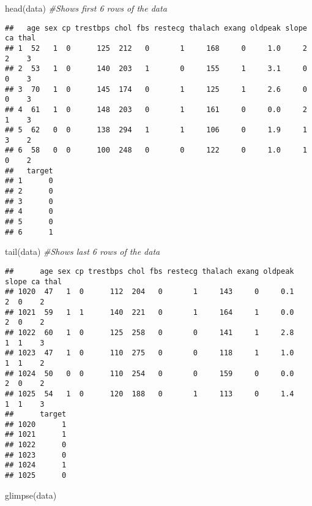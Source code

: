 \documentclass[
]{article}
\newenvironment{Shaded}{\begin{snugshade}}{\end{snugshade}}
\newcommand{\CommentTok}[1]{\textcolor[rgb]{0.56,0.35,0.01}{\textit{#1}}}
\newcommand{\FunctionTok}[1]{\textcolor[rgb]{0.00,0.00,0.00}{#1}}
\newcommand{\NormalTok}[1]{#1}
\begin{document}
\begin{Shaded}
\begin{Highlighting}[]
\FunctionTok{head}\NormalTok{(data) }\CommentTok{\#Shows first 6 rows of the data}
\end{Highlighting}
\end{Shaded}

\begin{verbatim}
##   age sex cp trestbps chol fbs restecg thalach exang oldpeak slope ca thal
## 1  52   1  0      125  212   0       1     168     0     1.0     2  2    3
## 2  53   1  0      140  203   1       0     155     1     3.1     0  0    3
## 3  70   1  0      145  174   0       1     125     1     2.6     0  0    3
## 4  61   1  0      148  203   0       1     161     0     0.0     2  1    3
## 5  62   0  0      138  294   1       1     106     0     1.9     1  3    2
## 6  58   0  0      100  248   0       0     122     0     1.0     1  0    2
##   target
## 1      0
## 2      0
## 3      0
## 4      0
## 5      0
## 6      1
\end{verbatim}

\begin{Shaded}
\begin{Highlighting}[]
\FunctionTok{tail}\NormalTok{(data) }\CommentTok{\#Shows last 6 rows of the data}
\end{Highlighting}
\end{Shaded}

\begin{verbatim}
##      age sex cp trestbps chol fbs restecg thalach exang oldpeak slope ca thal
## 1020  47   1  0      112  204   0       1     143     0     0.1     2  0    2
## 1021  59   1  1      140  221   0       1     164     1     0.0     2  0    2
## 1022  60   1  0      125  258   0       0     141     1     2.8     1  1    3
## 1023  47   1  0      110  275   0       0     118     1     1.0     1  1    2
## 1024  50   0  0      110  254   0       0     159     0     0.0     2  0    2
## 1025  54   1  0      120  188   0       1     113     0     1.4     1  1    3
##      target
## 1020      1
## 1021      1
## 1022      0
## 1023      0
## 1024      1
## 1025      0
\end{verbatim}

\begin{Shaded}
\begin{Highlighting}[]
\FunctionTok{glimpse}\NormalTok{(data)}
\end{Highlighting}
\end{Shaded}
\end{document}
